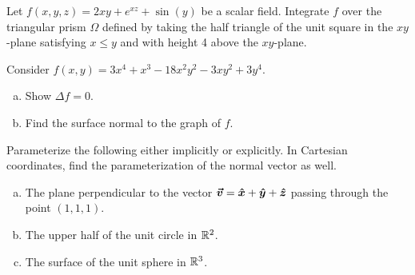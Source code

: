 \documentclass[12pt]{article} %
\begin{document}
\begin{problem}
Let $f(x,y,z)=2xy+e^{xz}+\sin(y)$ be a scalar field. Integrate $f$ over the triangular prism $\Omega$ defined by taking the half triangle of the unit square in the $xy$-plane satisfying $x\leq y$ and with height 4 above the $xy$-plane.
\end{problem}

\begin{problem}
Consider $f(x,y)= 3x^4+x^3-18x^2y^2-3xy^2+3y^4$. 
\begin{enumerate}[(a)]
    \item Show $\Delta f = 0$.
    \item Find the surface normal to the graph of $f$.
\end{enumerate}
\end{problem}

\begin{problem} 
Parameterize the following either implicitly or explicitly. In Cartesian coordinates, find the parameterization of the normal vector as well.
\begin{enumerate}[(a)]
	\item The plane perpendicular to the vector $\boldsymbol{\vec{v}} = \boldsymbol{\hat{x}} + \boldsymbol{\hat{y}} + \boldsymbol{\hat{z}}$ passing through the point $(1,1,1)$.
	\item The upper half of the unit circle in $\mathbb{R}^2$.
	\item The surface of the unit sphere in $\mathbb{R}^3$.
\end{enumerate}
\end{problem}
\end{document}
